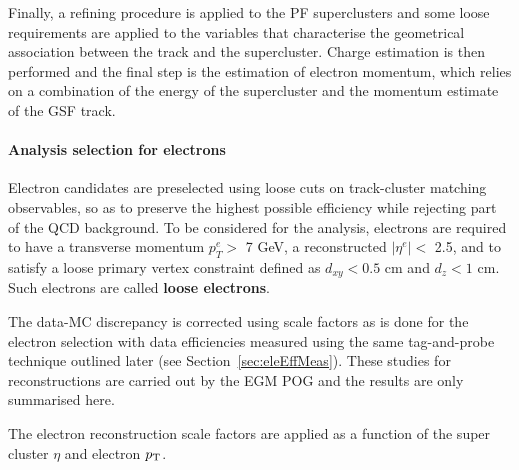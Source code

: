 Finally, a refining procedure is applied to the PF superclusters
and some loose requirements are applied to the variables that characterise the geometrical association between the track and the supercluster.
Charge estimation is then performed and the final step is the estimation of electron momentum,
which relies on a combination of the energy of the supercluster and the momentum estimate of the GSF track.

\paragraph{Analysis selection for electrons}

Electron candidates are preselected using loose cuts on track-cluster matching observables, so as to preserve the highest possible efficiency while rejecting part of the QCD background. To be considered for the analysis, electrons are required to have a
transverse momentum $p^e_T >$ 7 GeV, a reconstructed $|\eta^e| <$ 2.5, and to satisfy a loose primary vertex 
constraint defined as $d_{xy} < 0.5$ cm and $d_z < 1$ cm.
Such electrons are called {\bf loose electrons}.

The data-MC discrepancy is corrected using scale factors as is done for the electron selection with data efficiencies measured using the same tag-and-probe technique outlined later (see Section~\ref{sec:eleEffMeas}). 
These studies for reconstructions are carried out by the EGM POG and the results are only summarised here.

The electron reconstruction scale factors 
are applied as a function of the super cluster $\eta$ and electron $p_{\mathrm{T}}$.


